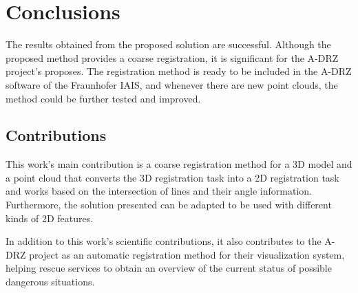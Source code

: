 

    \chapter{Conclusions}

    The results obtained from the proposed solution are successful. 
    Although the proposed method provides a coarse registration, it is significant for the A-DRZ project’s proposes. 
    The registration method is ready to be included in the A-DRZ software of the Fraunhofer IAIS, 
    and whenever there are new point clouds, the method could be further tested and improved.

    \section{Contributions}
        This work’s main contribution is a coarse registration method for a 3D model and a point cloud 
        that converts the 3D registration task into a 2D registration task and works based on the intersection of lines and their angle information. 
        Furthermore, the solution presented can be adapted to be used with different kinds of 2D features.
    
        In addition to this work’s scientific contributions, 
        it also contributes to the A-DRZ project as an automatic registration method for their visualization system, 
        helping rescue services to obtain an overview of the current status of possible dangerous situations.
    


